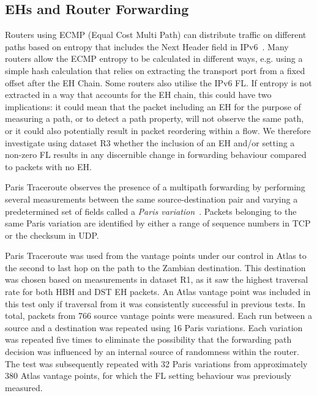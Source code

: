 \documentclass[conference]{IEEEtran}
\begin{document}
\subsection{EHs and Router Forwarding}

Routers using ECMP (Equal Cost Multi Path) can distribute traffic on different paths based on entropy that includes the Next Header field in
IPv6~\cite{lb-classification}. 
Many routers allow the ECMP entropy to be calculated in different ways,
e.g. using a simple hash calculation that relies on extracting the transport port from a fixed offset after the EH Chain. Some routers also utilise the IPv6 FL.
If entropy is not extracted in a way that accounts for the EH chain, this could have two implications: it could mean that the packet including an EH for the purpose of measuring a path, or to detect a path property, will not observe the same path, or it could also potentially result in packet reordering within a flow. 
We therefore investigate using dataset R3 whether the inclusion of an EH and/or setting a non-zero FL results in any discernible change in forwarding behaviour compared to packets with no EH.

% 


Paris Traceroute observes the presence of a multipath forwarding by 
performing several measurements between the same
source-destination pair and varying a predetermined set of fields called a
\textit{Paris variation}~\cite{augustin2006avoiding}.  Packets belonging to the
same Paris variation are identified by either a range of sequence numbers in
TCP or the checksum in UDP.


Paris Traceroute was used from the vantage points under our control in Atlas to
the second to last hop on the path to the Zambian destination. This destination was chosen based on measurements in dataset R1, as it saw the highest traversal rate for both HBH and DST EH packets. An Atlas vantage point was included in this test only if traversal from it was consistently successful in previous tests. In total, packets from 766
source vantage points were measured.  Each run between a source and a destination was
repeated using 16 Paris variations.  Each variation was repeated five
times to eliminate the possibility that the forwarding path decision was
influenced by an internal source of randomness within the router. 
The test was subsequently repeated with 32 Paris variations from approximately 380 Atlas vantage points, for which the FL setting behaviour was previously measured.
\end{document}
